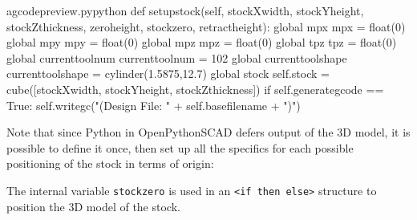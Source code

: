 \documentclass{ltxdoc}
\begin{document}
\lstset{firstnumber=\thegcpy}
\begin{writecode}{a}{gcodepreview.py}{python}
    def setupstock(self, stockXwidth,
                 stockYheight,
                 stockZthickness,
                 zeroheight,
                 stockzero,
                 retractheight):
        global mpx
        mpx = float(0)
        global mpy
        mpy = float(0)
        global mpz
        mpz = float(0)
        global tpz
        tpz = float(0)
        global currenttoolnum
        currenttoolnum = 102
        global currenttoolshape
        currenttoolshape = cylinder(1.5875,12.7)
        global stock
        self.stock = cube([stockXwidth, stockYheight, stockZthickness])
        if self.generategcode == True:
            self.writegc("(Design File: " + self.basefilename + ")")
\end{writecode}
\addtocounter{gcpy}{22}

Note that since Python in OpenPythonSCAD defers output of the 3D model, it is possible to define it once, then set up all the specifics for each possible positioning of the stock in terms of origin:

The internal variable \verb|stockzero| is used in an \verb|<if then else>| structure to position the 3D model of the stock. 
\end{document}
